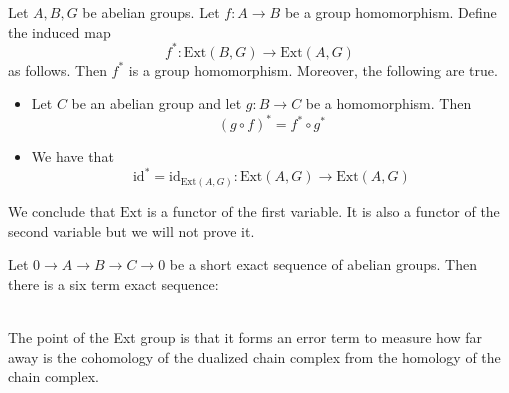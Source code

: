 \documentclass[a4paper]{article}
\begin{document}
\begin{prp}{}{} Let $A,B,G$ be abelian groups. Let $f:A\to B$ be a group homomorphism. Define the induced map $$f^\ast:\text{Ext}(B,G)\to\text{Ext}(A,G)$$ as follows. Then $f^\ast$ is a group homomorphism. Moreover, the following are true. 
\begin{itemize}
\item Let $C$ be an abelian group and let $g:B\to C$ be a homomorphism. Then $$(g\circ f)^\ast=f^\ast\circ g^\ast$$ 
\item We have that $$\text{id}^\ast=\text{id}_{\text{Ext}(A,G)}:\text{Ext}(A,G)\to\text{Ext}(A,G)$$
\end{itemize}
\end{prp}

We conclude that $\text{Ext}$ is a functor of the first variable. It is also a functor of the second variable but we will not prove it. 

\begin{prp}{}{} Let $0\to A\to B\to C\to 0$ be a short exact sequence of abelian groups. Then there is a six term exact sequence: \\~\\
\end{prp}

The point of the Ext group is that it forms an error term to measure how far away is the cohomology of the dualized chain complex from the homology of the chain complex. 
\end{document}
